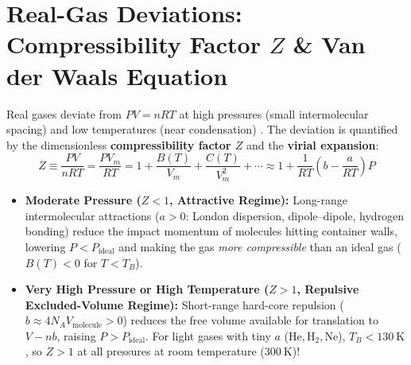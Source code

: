 \section{Real-Gas Deviations: Compressibility Factor $Z$ \& Van der Waals Equation}\label{sec:06.6}

Real gases deviate from $PV = nRT$ at high pressures (small intermolecular spacing) and low temperatures (near condensation) . The deviation is quantified by the dimensionless \textbf{compressibility factor $Z$} and the \textbf{virial expansion}:
\begin{equation}\label{eq:06:z-virial}
  Z \equiv \frac{PV}{nRT} = \frac{P V_m}{RT} = 1 + \frac{B(T)}{V_m} + \frac{C(T)}{V_m^2} + \cdots \approx 1 + \frac{1}{RT}\left(b - \frac{a}{RT}\right)P
\end{equation}
\begin{itemize}
  \item \textbf{Moderate Pressure ($Z < 1$, Attractive Regime):} Long-range intermolecular attractions ($a > 0$: London dispersion, dipole--dipole, hydrogen bonding) reduce the impact momentum of molecules hitting container walls, lowering $P < P_{\mathrm{ideal}}$ and making the gas \emph{more compressible} than an ideal gas ($B(T) < 0$ for $T < T_B$).
  \item \textbf{Very High Pressure or High Temperature ($Z > 1$, Repulsive Excluded-Volume Regime):} Short-range hard-core repulsion ($b \approx 4N_A V_{\mathrm{molecule}} > 0$) reduces the free volume available for translation to $V - nb$, raising $P > P_{\mathrm{ideal}}$. For light gases with tiny $a$ ($\mathrm{He}, \mathrm{H_2}, \mathrm{Ne}$), $T_B < \SI{130}{\kelvin}$, so $Z > 1$ at all pressures at room temperature ($\SI{300}{\kelvin}$)!
\end{itemize}

